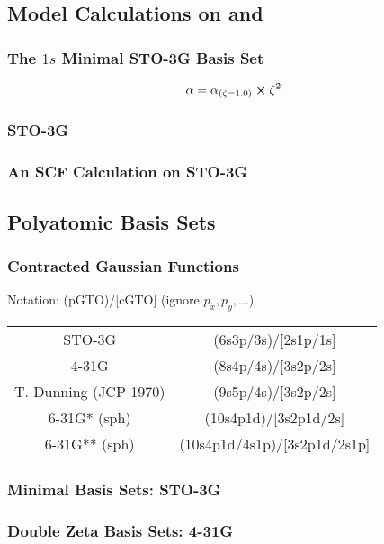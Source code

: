 \documentclass[a4paper]{article}
\numberwithin{equation}{section}
\begin{document}
\subsection{Model Calculations on  and }
\subsubsection{The $ 1s $ Minimal STO-3G Basis Set}
\begin{equation}\label{key}
\alpha = \alpha_{(\zeta=1.0)}\cross \zeta^2
\end{equation}
\subsubsection{STO-3G }

\subsubsection{An SCF Calculation on STO-3G }

\subsection{Polyatomic Basis Sets}
\subsubsection{Contracted Gaussian Functions}
Notation: (pGTO)/[cGTO] (ignore $ p_x,p_y,... $)
\begin{table}[H]
	\begin{tabular}{cc}
		STO-3G & (6s3p/3s)/[2s1p/1s]\\
		4-31G & (8s4p/4s)/[3s2p/2s] \\
		T. Dunning (JCP 1970) & (9s5p/4s)/[3s2p/2s] \\ 
		6-31G* (sph) & (10s4p1d)/[3s2p1d/2s] \\
		6-31G** (sph) & (10s4p1d/4s1p)/[3s2p1d/2s1p]
	\end{tabular}
\end{table}
\subsubsection{Minimal Basis Sets: STO-3G}

\subsubsection{Double Zeta Basis Sets: 4-31G}
\end{document}
